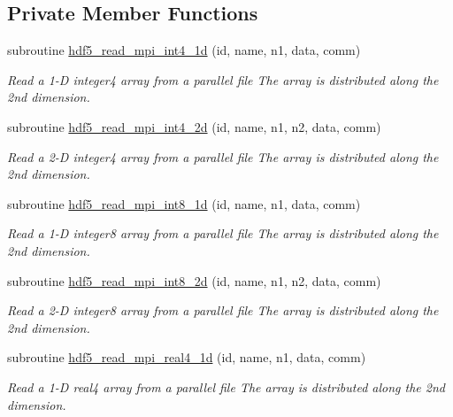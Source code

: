 \subsection*{Private Member Functions}
\begin{DoxyCompactItemize}
\item 
subroutine \hyperlink{interfacemodhdf5_1_1hdf5__read__mpi__data_a1ad636a13c51c50de13eb1070aa325cc}{hdf5\+\_\+read\+\_\+mpi\+\_\+int4\+\_\+1d} (id, name, n1, data, comm)
\begin{DoxyCompactList}\small\item\em Read a 1-\/D integer4 array from a parallel file The array is distributed along the 2nd dimension. \end{DoxyCompactList}\item 
subroutine \hyperlink{interfacemodhdf5_1_1hdf5__read__mpi__data_adb25b404c7babd67561b609444f8b372}{hdf5\+\_\+read\+\_\+mpi\+\_\+int4\+\_\+2d} (id, name, n1, n2, data, comm)
\begin{DoxyCompactList}\small\item\em Read a 2-\/D integer4 array from a parallel file The array is distributed along the 2nd dimension. \end{DoxyCompactList}\item 
subroutine \hyperlink{interfacemodhdf5_1_1hdf5__read__mpi__data_a5a546e3a8ad2c01aa03f85ff9225d0ca}{hdf5\+\_\+read\+\_\+mpi\+\_\+int8\+\_\+1d} (id, name, n1, data, comm)
\begin{DoxyCompactList}\small\item\em Read a 1-\/D integer8 array from a parallel file The array is distributed along the 2nd dimension. \end{DoxyCompactList}\item 
subroutine \hyperlink{interfacemodhdf5_1_1hdf5__read__mpi__data_a7dcef34e2058f35d081d1c9b38269c6d}{hdf5\+\_\+read\+\_\+mpi\+\_\+int8\+\_\+2d} (id, name, n1, n2, data, comm)
\begin{DoxyCompactList}\small\item\em Read a 2-\/D integer8 array from a parallel file The array is distributed along the 2nd dimension. \end{DoxyCompactList}\item 
subroutine \hyperlink{interfacemodhdf5_1_1hdf5__read__mpi__data_a207ca36c3b403b84d6252beab44f0272}{hdf5\+\_\+read\+\_\+mpi\+\_\+real4\+\_\+1d} (id, name, n1, data, comm)
\begin{DoxyCompactList}\small\item\em Read a 1-\/D real4 array from a parallel file The array is distributed along the 2nd dimension. \end{DoxyCompactList}\item 

\end{DoxyCompactItemize}
